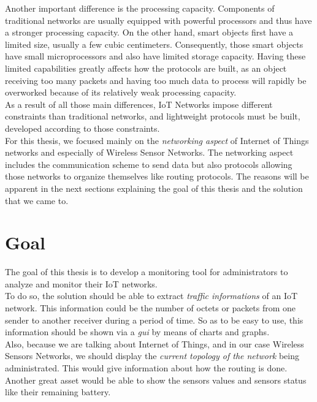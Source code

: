 Another important difference is the processing capacity. Components of traditional networks are usually equipped with powerful processors and thus have a stronger processing capacity. On the other hand, smart objects first have a limited size, usually a few cubic centimeters. Consequently, those smart objects have small microprocessors and also have limited storage capacity. Having these limited capabilities greatly affects how the protocols are built, as an object receiving too many packets and having too much data to process will rapidly be overworked because of its relatively weak processing capacity. \\

As a result of all those main differences, IoT Networks impose different constraints than traditional networks, and lightweight protocols must be built, developed according to those constraints.\\

For this thesis, we focused mainly on the \textit{networking aspect} of Internet of Things networks and especially of Wireless Sensor Networks. The networking aspect includes the communication scheme to send data but also protocols allowing those networks to organize themselves like routing protocols. The reasons will be apparent in the next sections explaining the goal of this thesis and the solution that we came to.

\section*{Goal}

The goal of this thesis is to develop a monitoring tool for administrators to analyze and monitor their IoT networks.\\

To do so, the solution should be able to extract \textit{traffic informations} of an IoT network. This information could be the number of octets or packets from one sender to another receiver during a period of time. So as to be easy to use, this information should be shown via a \textit{\acrfull{gui}} by means of charts and graphs. \\

Also, because we are talking about Internet of Things, and in our case Wireless Sensors Networks, we should display the \textit{current topology of the network} being administrated. This would give information about how the routing is done. Another great asset would be able to show the sensors values and sensors status like their remaining battery.\\

